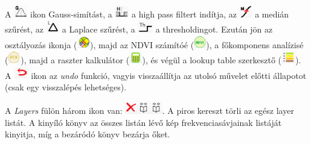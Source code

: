 \documentclass[a4paper,12pt]{article}
\begin{document}
A \includegraphics[height=0.55cm]{gaussikon} ikon Gauss-simítást, a \includegraphics[height=0.55cm]{highpassikon} a high pass filtert indítja, az \includegraphics[height=0.55cm]{medianikon} a medián szűrést, az \includegraphics[height=0.55cm]{laplaceikon} a Laplace szűrést, a \includegraphics[height=0.55cm]{thresholdikon} a thresholdingot. Ezután jön az osztályozás ikonja (\includegraphics[height=0.55cm]{clusterikon}), majd az NDVI számítóé (\includegraphics[height=0.55cm]{ndviikon}), a főkomponens analízisé (\includegraphics[height=0.55cm]{pcaikon}), majd a raszter kalkulátor (\includegraphics[height=0.55cm]{calcikon}), és végül a lookup table szerkesztő (\includegraphics[height=0.55cm]{lookupikon}). A \includegraphics[height=0.55cm]{undoikon} ikon az \textit{undo} funkció, vagyis visszaállítja az utolsó művelet előtti állapotot (csak egy visszalépés lehetséges). 

A \textit{Layers} fülön három ikon van: \includegraphics[height=0.55cm]{layer_list_icons.png}. A piros kereszt törli az egész layer listát. A kinyíló könyv az összes listán lévő kép frekvenciasávjainak listáját kinyitja, míg a bezáródó könyv bezárja őket. 
\end{document}
